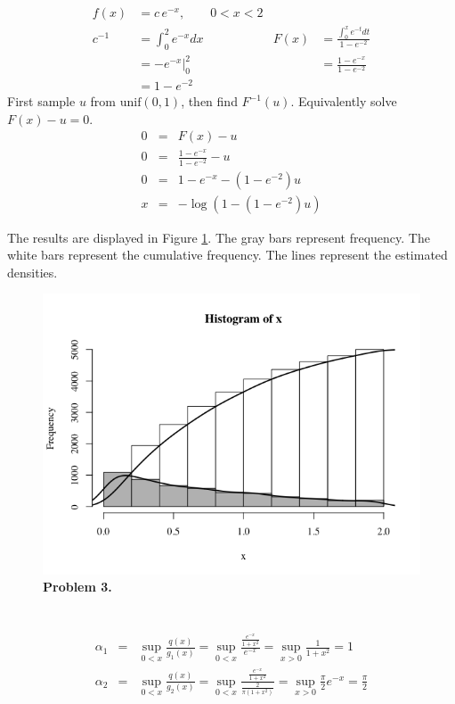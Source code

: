 \documentclass[11pt]{article}
\begin{document}
\begin{align*}
  f(x)&=c\,e^{-x},\qquad 0<x<2\\
  c^{-1}&=\int_0^2e^{-x}dx&  F(x)&=\frac{\displaystyle \int_0^xe^{-t}dt}{1-e^{-2}}\\
      &=\left.-e^{-x}\right\rvert_0^2&      &=\frac{1-e^{-x}}{ 1-e^{-2}}\\
      &=1-e^{-2}
\end{align*}
First sample $u$ from $\textrm{unif}(0,1)$, then find $F^{-1}(u)$. Equivalently solve $F(x)-u=0$.
\begin{eqnarray*}
  0&=&F(x)-u\\
  0&=&\frac{1-e^{-x}}{ 1-e^{-2}}-u\\
  0&=&1-e^{-x}-\left(1-e^{-2}\right)u\\
  x&=&-\log\left(1-\left(1-e^{-2}\right)u\right)
\end{eqnarray*}

The results are displayed in Figure \ref{inverse}. The gray bars represent frequency. The white bars represent the cumulative frequency. The lines represent the estimated densities.

\begin{figure}[h!]
  \begin{center}
    \includegraphics[height=0.32\textheight,width=0.6\linewidth]{inversetransform}
  \end{center}
  \caption{\textbf{Problem 3.}}
  \label{inverse}
\end{figure}

\section{}

\subsection{}

\begin{eqnarray*}
  \alpha_1&=&\sup_{0<x}\frac{q(x)}{g_1(x)}=\sup_{0<x}\frac{\displaystyle \frac{e^{-x}}{1+x^2}}{e^{-x}}=\sup_{x>0}\frac{1}{1+x^2}=1\\
  \alpha_2&=&\sup_{0<x}\frac{q(x)}{g_2(x)}=\sup_{0<x}\frac{\displaystyle \frac{e^{-x}}{1+x^2}}{\displaystyle \frac{2}{\pi\left(1+x^2\right)}}=\sup_{x>0}\frac{\pi}{2}e^{-x}=\frac{\pi}{2}
\end{eqnarray*}
\end{document}
